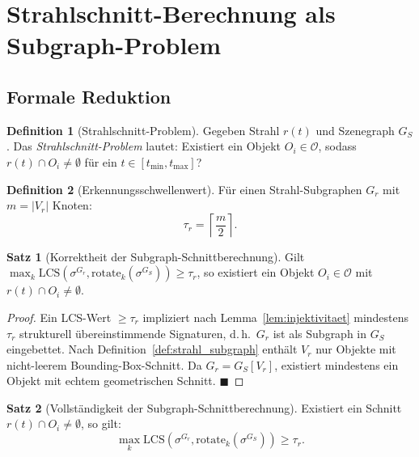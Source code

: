 ﻿\documentclass[a4paper,12pt]{article}
\theoremstyle{definition}
\newtheorem{definition}{Definition}[section]
\newtheorem{satz}{Satz}[section]
\begin{document}
\section{Strahlschnitt-Berechnung als Subgraph-Problem}

\subsection{Formale Reduktion}

\begin{definition}[Strahlschnitt-Problem]
  \label{def:strahlschnitt}
  Gegeben Strahl $r(t)$ und Szenegraph $G_S$.
  Das \emph{Strahlschnitt-Problem} lautet: Existiert ein Objekt
  $O_i \in \mathcal{O}$, sodass $r(t) \cap O_i \neq \emptyset$
  für ein $t \in [t_{\min}, t_{\max}]$?
\end{definition}

\begin{definition}[Erkennungsschwellenwert]
  \label{def:schwellenwert}
  Für einen Strahl-Subgraphen $G_r$ mit $m = |V_r|$ Knoten:
  \[
    \tau_r = \left\lceil \frac{m}{2} \right\rceil.
  \]
\end{definition}

\begin{satz}[Korrektheit der Subgraph-Schnittberechnung]
  \label{satz:schnitt_korrektheit}
  Gilt $\max_k \mathrm{LCS}(\sigma^{G_r},
  \mathrm{rotate}_k(\sigma^{G_S})) \geq \tau_r$, so existiert
  ein Objekt $O_i \in \mathcal{O}$ mit $r(t) \cap O_i \neq \emptyset$.
\end{satz}

\begin{proof}
  Ein LCS-Wert $\geq \tau_r$ impliziert nach
  Lemma~\ref{lem:injektivitaet} mindestens $\tau_r$ strukturell
  übereinstimmende Signaturen, d.\,h.\ $G_r$ ist als Subgraph in
  $G_S$ eingebettet. Nach Definition~\ref{def:strahl_subgraph}
  enthält $V_r$ nur Objekte mit nicht-leerem Bounding-Box-Schnitt.
  Da $G_r = G_S[V_r]$, existiert mindestens ein Objekt mit
  echtem geometrischen Schnitt. \hfill$\blacksquare$
\end{proof}

\begin{satz}[Vollständigkeit der Subgraph-Schnittberechnung]
  \label{satz:schnitt_vollstaendigkeit}
  Existiert ein Schnitt $r(t) \cap O_i \neq \emptyset$, so gilt:
  \[
    \max_k \mathrm{LCS}\!\left(\sigma^{G_r},
    \mathrm{rotate}_k(\sigma^{G_S})\right) \geq \tau_r.
  \]
\end{satz}
\end{document}
